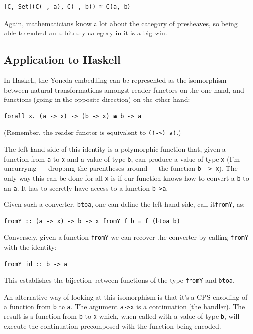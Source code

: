 \begin{verbatim}
[C, Set](C(-, a), C(-, b)) ≅ C(a, b)
\end{verbatim}

Again, mathematicians know a lot about the category of presheaves, so
being able to embed an arbitrary category in it is a big win.

\subsection{Application to Haskell}\label{application-to-haskell}

In Haskell, the Yoneda embedding can be represented as the isomorphism
between natural transformations amongst reader functors on the one hand,
and functions (going in the opposite direction) on the other hand:

\begin{verbatim}
forall x. (a -> x) -> (b -> x) ≅ b -> a
\end{verbatim}

(Remember, the reader functor is equivalent to
\texttt{((-\textgreater{})\ a)}.)

The left hand side of this identity is a polymorphic function that,
given a function from \texttt{a} to \texttt{x} and a value of type
\texttt{b}, can produce a value of type \texttt{x} (I'm uncurrying ---
dropping the parentheses around --- the function
\texttt{b\ -\textgreater{}\ x}). The only way this can be done for all
\texttt{x} is if our function knows how to convert a \texttt{b} to an
\texttt{a}. It has to secretly have access to a function
\texttt{b-\textgreater{}a}.

Given such a converter, \texttt{btoa}, one can define the left hand
side, call it\texttt{fromY}, as:

\begin{verbatim}
fromY :: (a -> x) -> b -> x fromY f b = f (btoa b)
\end{verbatim}

Conversely, given a function \texttt{fromY} we can recover the converter
by calling \texttt{fromY} with the identity:

\begin{verbatim}
fromY id :: b -> a
\end{verbatim}

This establishes the bijection between functions of the type
\texttt{fromY} and \texttt{btoa}.

An alternative way of looking at this isomorphism is that it's a CPS
encoding of a function from \texttt{b} to \texttt{a}. The argument
\texttt{a-\textgreater{}x} is a continuation (the handler). The result
is a function from \texttt{b} to \texttt{x} which, when called with a
value of type \texttt{b}, will execute the continuation precomposed with
the function being encoded.

